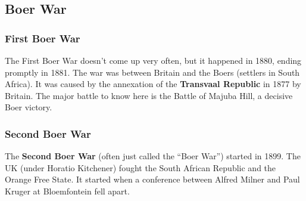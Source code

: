 \subsection*{Boer War}

\subsubsection*{First Boer War}

The First Boer War doesn't come up very often, but it happened in 1880, ending promptly in 1881.
The war was between Britain and the Boers (settlers in South Africa).
It was caused by the annexation of the \textbf{Transvaal Republic} in 1877 by Britain.
The major battle to know here is the Battle of Majuba Hill, a decisive Boer victory.

\subsubsection*{Second Boer War}

The \textbf{Second Boer War} (often just called the ``Boer War'') started in 1899.
The UK (under Horatio Kitchener) fought the South African Republic and the Orange Free State.
It started when a conference between Alfred Milner and Paul Kruger at Bloemfontein fell apart.
